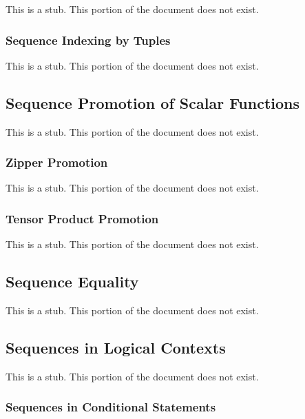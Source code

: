 This is a stub.  This portion of the document does not exist.

\subsubsection{Sequence Indexing by Tuples}
\label{Sequence_Indexing_by_Tuples}

This is a stub.  This portion of the document does not exist.

\subsection{Sequence Promotion of Scalar Functions}
\label{Sequence_Promotion_of_Scalar_Functions}

This is a stub.  This portion of the document does not exist.

\subsubsection{Zipper Promotion}
\label{Zipper_Promotion}

This is a stub.  This portion of the document does not exist.

\subsubsection{Tensor Product Promotion}
\label{Tensor_Product_Promotion}

This is a stub.  This portion of the document does not exist.

\subsection{Sequence Equality}
\label{Sequence_Equality}

This is a stub.  This portion of the document does not exist.

\subsection{Sequences in Logical Contexts}
\label{Sequences_in_Logical_Contexts}

This is a stub.  This portion of the document does not exist.

\subsubsection{Sequences in Conditional Statements}
\label{Sequences_in_Conditional_Statements}

